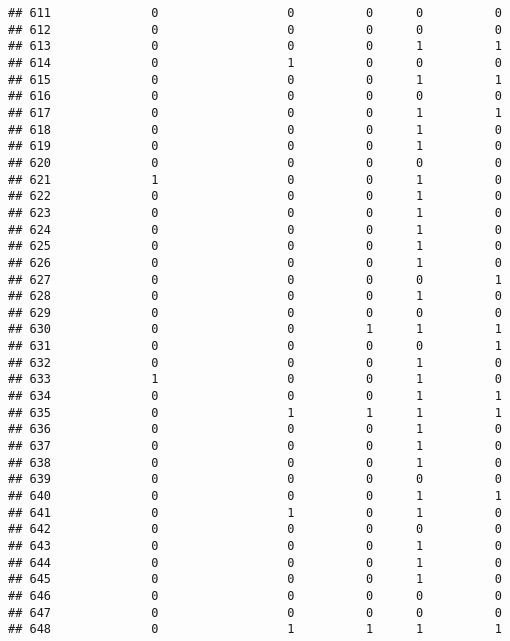 \documentclass[
]{article}
\begin{document}
\begin{verbatim}
## 611              0                  0          0      0          0
## 612              0                  0          0      0          0
## 613              0                  0          0      1          1
## 614              0                  1          0      0          0
## 615              0                  0          0      1          1
## 616              0                  0          0      0          0
## 617              0                  0          0      1          1
## 618              0                  0          0      1          0
## 619              0                  0          0      1          0
## 620              0                  0          0      0          0
## 621              1                  0          0      1          0
## 622              0                  0          0      1          0
## 623              0                  0          0      1          0
## 624              0                  0          0      1          0
## 625              0                  0          0      1          0
## 626              0                  0          0      1          0
## 627              0                  0          0      0          1
## 628              0                  0          0      1          0
## 629              0                  0          0      0          0
## 630              0                  0          1      1          1
## 631              0                  0          0      0          1
## 632              0                  0          0      1          0
## 633              1                  0          0      1          0
## 634              0                  0          0      1          1
## 635              0                  1          1      1          1
## 636              0                  0          0      1          0
## 637              0                  0          0      1          0
## 638              0                  0          0      1          0
## 639              0                  0          0      0          0
## 640              0                  0          0      1          1
## 641              0                  1          0      1          0
## 642              0                  0          0      0          0
## 643              0                  0          0      1          0
## 644              0                  0          0      1          0
## 645              0                  0          0      1          0
## 646              0                  0          0      0          0
## 647              0                  0          0      0          0
## 648              0                  1          1      1          1

\end{verbatim}
\end{document}

